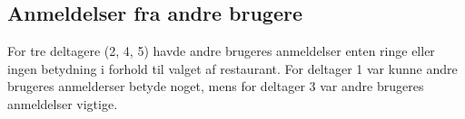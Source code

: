 \documentclass[a4paper, 12pt]{article}
\begin{document}


\subsection{Anmeldelser fra andre brugere}
For tre deltagere (2, 4, 5) havde andre brugeres anmeldelser enten
ringe eller ingen betydning i forhold til valget af restaurant. For
deltager 1 var kunne andre brugeres anmelderser betyde noget, mens for
deltager 3 var andre brugeres anmeldelser vigtige.


\end{document}

